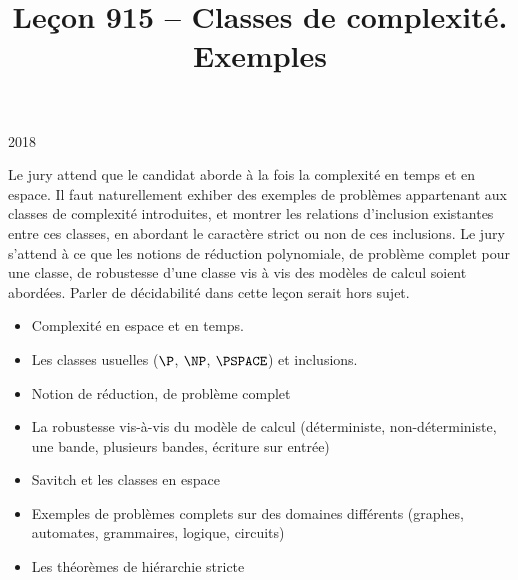 \documentclass{agregfiche}
\title{Leçon 915 -- Classes de complexité. Exemples}
\begin{document}
\maketitle

\secrapports

\begin{rapport}{2018}

Le jury attend que le candidat aborde à la fois la complexité en temps et en
espace. Il faut naturellement exhiber des exemples de problèmes appartenant aux
classes de complexité introduites, et montrer les relations d’inclusion
existantes entre ces classes, en abordant le caractère strict ou non de ces
inclusions. Le jury s’attend à ce que les notions de réduction polynomiale, de
problème complet pour une classe, de robustesse d’une classe vis à vis des
modèles de calcul soient abordées. Parler de décidabilité dans cette leçon
serait hors sujet.

\end{rapport}

\secindispensables

\begin{itemize}
    \item Complexité en espace et en temps.
    \item Les classes usuelles ($\P$, $\NP$, $\PSPACE$) et inclusions.
    \item Notion de réduction, de problème complet
    

\end{itemize}

\secasavoir

\begin{itemize}

	\item La robustesse vis-à-vis du modèle de calcul 
	(déterministe, non-déterministe, une bande, plusieurs 
	bandes, écriture sur entrée)
	\item Savitch et les classes en espace
	\item Exemples de problèmes complets sur des 
	domaines différents (graphes, automates,
	grammaires, logique, circuits)
	\item Les théorèmes de hiérarchie stricte
\end{itemize}
\end{document}
